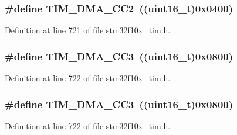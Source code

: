 \subsubsection[{\texorpdfstring{T\+I\+M\+\_\+\+D\+M\+A\+\_\+\+C\+C2}{TIM_DMA_CC2}}]{\setlength{\rightskip}{0pt plus 5cm}\#define T\+I\+M\+\_\+\+D\+M\+A\+\_\+\+C\+C2~(({\bf uint16\+\_\+t})0x0400)}\hypertarget{group___t_i_m___d_m_a__sources_ga792f73196a8e7424655592097d7a3fd5}{}\label{group___t_i_m___d_m_a__sources_ga792f73196a8e7424655592097d7a3fd5}


Definition at line 721 of file stm32f10x\+\_\+tim.\+h.

\subsubsection[{\texorpdfstring{T\+I\+M\+\_\+\+D\+M\+A\+\_\+\+C\+C3}{TIM_DMA_CC3}}]{\setlength{\rightskip}{0pt plus 5cm}\#define T\+I\+M\+\_\+\+D\+M\+A\+\_\+\+C\+C3~(({\bf uint16\+\_\+t})0x0800)}\hypertarget{group___t_i_m___d_m_a__sources_ga3eb2dadbd3109bced45935fb53deeee1}{}\label{group___t_i_m___d_m_a__sources_ga3eb2dadbd3109bced45935fb53deeee1}


Definition at line 722 of file stm32f10x\+\_\+tim.\+h.

\subsubsection[{\texorpdfstring{T\+I\+M\+\_\+\+D\+M\+A\+\_\+\+C\+C3}{TIM_DMA_CC3}}]{\setlength{\rightskip}{0pt plus 5cm}\#define T\+I\+M\+\_\+\+D\+M\+A\+\_\+\+C\+C3~(({\bf uint16\+\_\+t})0x0800)}\hypertarget{group___t_i_m___d_m_a__sources_ga3eb2dadbd3109bced45935fb53deeee1}{}\label{group___t_i_m___d_m_a__sources_ga3eb2dadbd3109bced45935fb53deeee1}


Definition at line 722 of file stm32f10x\+\_\+tim.\+h.

